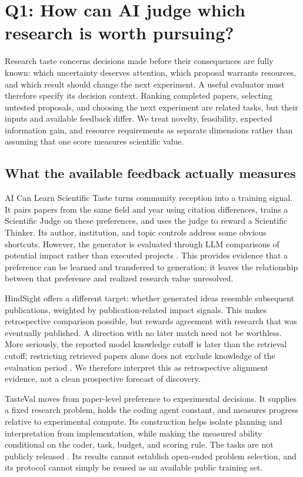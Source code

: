\section{Q1: How can AI judge which research is worth pursuing?}
\label{sec:taste}

Research taste concerns decisions made before their consequences are fully known: which uncertainty deserves attention, which proposal warrants resources, and which result should change the next experiment. A useful evaluator must therefore specify its decision context. Ranking completed papers, selecting untested proposals, and choosing the next experiment are related tasks, but their inputs and available feedback differ. We treat novelty, feasibility, expected information gain, and resource requirements as separate dimensions rather than assuming that one score measures scientific value.

\subsection{What the available feedback actually measures}

AI Can Learn Scientific Taste turns community reception into a training signal. It pairs papers from the same field and year using citation differences, trains a Scientific Judge on these preferences, and uses the judge to reward a Scientific Thinker. Its author, institution, and topic controls address some obvious shortcuts. However, the generator is evaluated through LLM comparisons of potential impact rather than executed projects \cite{ai-can-learn-scientific-taste}. This provides evidence that a preference can be learned and transferred to generation; it leaves the relationship between that preference and realized research value unresolved.

HindSight offers a different target: whether generated ideas resemble subsequent publications, weighted by publication-related impact signals. This makes retrospective comparison possible, but rewards agreement with research that was eventually published. A direction with no later match need not be worthless. More seriously, the reported model knowledge cutoff is later than the retrieval cutoff; restricting retrieved papers alone does not exclude knowledge of the evaluation period \cite{hindsight}. We therefore interpret this as retrospective alignment evidence, not a clean prospective forecast of discovery.

TasteVal moves from paper-level preference to experimental decisions. It supplies a fixed research problem, holds the coding agent constant, and measures progress relative to experimental compute. Its construction helps isolate planning and interpretation from implementation, while making the measured ability conditional on the coder, task, budget, and scoring rule. The tasks are not publicly released \cite{tasteval}. Its results cannot establish open-ended problem selection, and its protocol cannot simply be reused as an available public training set.

